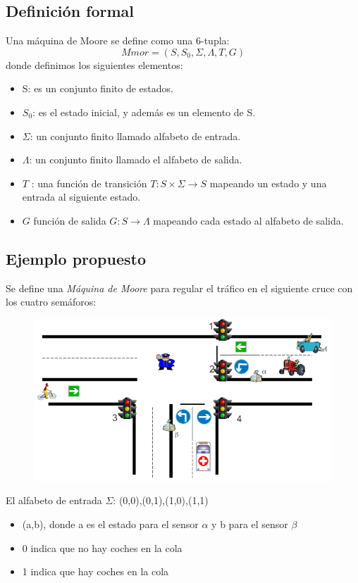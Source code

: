 \documentclass[12pt,a4paper]{article}
\begin{document}
	\subsection{Definición formal}
	Una máquina de Moore se define como una 6-tupla:
	\[ Mmor = (S,S_{0},\Sigma,\Lambda,T,G)  \]
	donde definimos los siguientes elementos:
	\begin{itemize}
		\item S: es un conjunto finito de estados.
		\item $S_{0}$: es el estado inicial, y además es un elemento de S.
		\item $\Sigma$: un conjunto finito llamado alfabeto de entrada.
		\item $\Lambda$: un conjunto finito llamado el alfabeto de salida.
		\item $T$ : una función de transición $T: S \times \Sigma \rightarrow S$ mapeando un estado y una entrada al siguiente estado.
		\item $G$ función de salida $G : S \rightarrow \Lambda $ mapeando cada estado al alfabeto de salida.
	\end{itemize}
	\clearpage

	
	\newpage
	\subsection{Ejemplo propuesto}
	Se define una \textit{Máquina de Moore} para regular el tráfico en el siguiente cruce con los cuatro semáforos:
		
	\begin{figure}[h]
		\centering
		\includegraphics[width=0.4
		\linewidth]{img/4}
		\caption{}
		\label{fig:4}
	\end{figure}

El alfabeto de entrada $\Sigma$: {(0,0),(0,1),(1,0),(1,1)}

	\begin{itemize}
		\item (a,b), donde a es el estado para el sensor $\alpha$ y b para el sensor $\beta$
		\item 0 indica que no hay coches en la cola
		\item 1 indica que hay coches en la cola
	\end{itemize}
\end{document}
